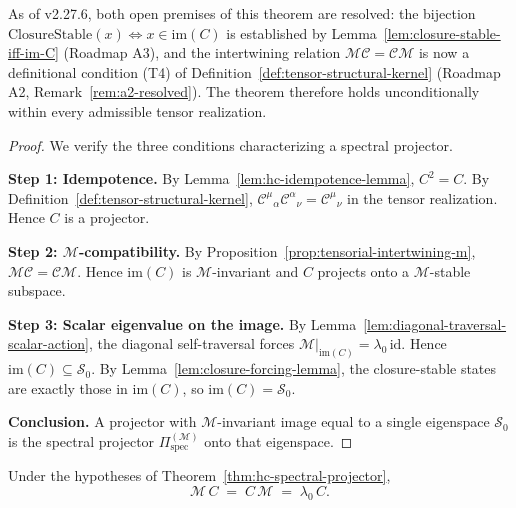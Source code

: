 \begin{remark}
\label{rem:hc-spectral-projector-conditional}
As of v2.27.6, both open premises of this theorem are resolved:
the bijection $\mathrm{ClosureStable}(x)\Leftrightarrow x\in\mathrm{im}(C)$
is established by Lemma~\ref{lem:closure-stable-iff-im-C} (Roadmap A3),
and the intertwining relation $\mathcal{M}\mathcal{C}=\mathcal{C}\mathcal{M}$
is now a definitional condition (T4) of
Definition~\ref{def:tensor-structural-kernel} (Roadmap A2,
Remark~\ref{rem:a2-resolved}).
The theorem therefore holds unconditionally within every admissible
tensor realization.
\end{remark}

\begin{proof}
We verify the three conditions characterizing a spectral projector.

\smallskip
\noindent\textbf{Step 1: Idempotence.}
By Lemma~\ref{lem:hc-idempotence-lemma}, $C^2=C$. By
Definition~\ref{def:tensor-structural-kernel},
$\mathcal{C}^\mu{}_\alpha\mathcal{C}^\alpha{}_\nu = \mathcal{C}^\mu{}_\nu$
in the tensor realization. Hence $C$ is a projector.

\smallskip
\noindent\textbf{Step 2: $\mathcal{M}$-compatibility.}
By Proposition~\ref{prop:tensorial-intertwining-m},
$\mathcal{M}\mathcal{C} = \mathcal{C}\mathcal{M}$. Hence $\mathrm{im}(C)$
is $\mathcal{M}$-invariant and $C$ projects onto a $\mathcal{M}$-stable
subspace.

\smallskip
\noindent\textbf{Step 3: Scalar eigenvalue on the image.}
By Lemma~\ref{lem:diagonal-traversal-scalar-action}, the diagonal
self-traversal forces $\mathcal{M}|_{\mathrm{im}(C)} = \lambda_0\,\mathrm{id}$.
Hence $\mathrm{im}(C) \subseteq \mathcal{S}_0$.
By Lemma~\ref{lem:closure-forcing-lemma}, the closure-stable states are
exactly those in $\mathrm{im}(C)$, so $\mathrm{im}(C) = \mathcal{S}_0$.

\smallskip
\noindent\textbf{Conclusion.}
A projector with $\mathcal{M}$-invariant image equal to a single eigenspace
$\mathcal{S}_0$ is the spectral projector $\Pi^{(\mathcal{M})}_{\mathrm{spec}}$
onto that eigenspace.
\end{proof}

\begin{corollary}
\label{cor:M-HC-fixpoint}
Under the hypotheses of Theorem~\ref{thm:hc-spectral-projector},
\[
  \mathcal{M}\,C \;=\; C\,\mathcal{M} \;=\; \lambda_0\,C.
\]
\end{corollary}

